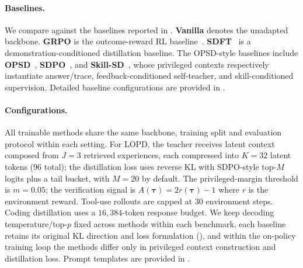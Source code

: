 \documentclass{article} %
\newcommand{\ourmethod}{{\textsc{LOPD}}\xspace}
\begin{document}
\vspace{-0.7em}
\paragraph{Baselines.}
We compare against the baselines reported in . \textbf{Vanilla} denotes the unadapted backbone. \textbf{GRPO} is the outcome-reward RL baseline~\citep{shao2024deepseekmath}. \textbf{SDFT}~\citep{shenfeld2026selfdistillationenablescontinuallearning} is a demonstration-conditioned distillation baseline. The OPSD-style baselines include \textbf{OPSD}~\citep{zhao2026selfdistilledreasoneronpolicyselfdistillation}, \textbf{SDPO}~\citep{hbotter2026reinforcementlearningselfdistillation}, and \textbf{Skill-SD}~\citep{wang2026skillsdskillconditionedselfdistillationmultiturn}, whose privileged contexts respectively instantiate answer/trace, feedback-conditioned self-teacher, and skill-conditioned supervision. Detailed baseline configurations are provided in .



\vspace{-0.7em}
\paragraph{Configurations.}
All trainable methods share the same backbone, training split and evaluation protocol within each setting. For \ourmethod, the teacher receives latent context composed from $J{=}3$ retrieved experiences, each compressed into $K{=}32$ latent tokens ($96$ total); the distillation loss uses reverse KL with SDPO-style top-$M$ logits plus a tail bucket, with $M{=}20$ by default. The privileged-margin threshold is $m{=}0.05$; the verification signal is $A(\boldsymbol{\tau})=2r(\boldsymbol{\tau})-1$ where $r$ is the environment reward. Tool-use rollouts are capped at $30$ environment steps. Coding distillation uses a $16{,}384$-token response budget. We keep decoding temperature/top-$p$ fixed across methods within each benchmark, each baseline retains its original KL direction and loss formulation (), and within the on-policy training loop the methods differ only in privileged context construction and distillation loss. Prompt templates are provided in .
\end{document}
